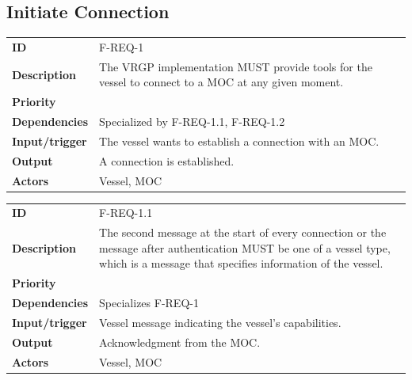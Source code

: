 \subsection{Initiate Connection}

\begin{table}[H]
	\centering
	\begin{tabularx}{\textwidth}{ l X }
		\rowcolor[HTML]{E7E7E7}
		\textbf{ID} & F-REQ-1 \\
		\textbf{Description} & The VRGP implementation MUST provide tools for the vessel to connect to a MOC at any given moment. \\
		\rowcolor[HTML]{E7E7E7}
		\textbf{Priority} & \priohigh \\
		\textbf{Dependencies} & Specialized by F-REQ-1.1, F-REQ-1.2 \\
		\rowcolor[HTML]{E7E7E7}
		\textbf{Input/trigger} & The vessel wants to establish a connection with an MOC. \\
		\textbf{Output} & A connection is established. \\
		\rowcolor[HTML]{E7E7E7}
		\textbf{Actors} & Vessel, MOC \\
	\end{tabularx}
	\label{table:f-req-1}
\end{table}

\begin{table}[H]
\centering
	\begin{tabularx}{\textwidth}{ l X }
		\rowcolor[HTML]{E7E7E7}
		\textbf{ID} & F-REQ-1.1 \\
		\textbf{Description} & The second message at the start of every connection or the message after authentication MUST be one of a vessel type, which is a message that specifies information of the vessel. \\
		\rowcolor[HTML]{E7E7E7}
		\textbf{Priority} & \priohigh \\
		\textbf{Dependencies} & Specializes F-REQ-1 \\
		\rowcolor[HTML]{E7E7E7}
		\textbf{Input/trigger} & Vessel message indicating the vessel’s capabilities. \\
		\textbf{Output} & Acknowledgment from the MOC. \\
		\rowcolor[HTML]{E7E7E7}
		\textbf{Actors} & Vessel, MOC \\
	\end{tabularx}
	\label{table:f-req-1.1}
\end{table}

